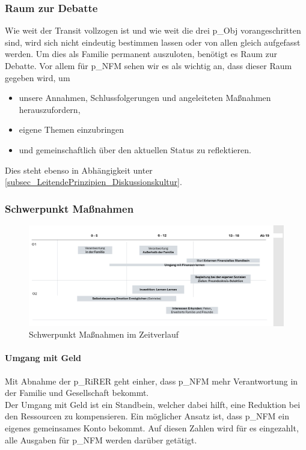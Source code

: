 \subsubsection{Raum zur Debatte} 
Wie weit der Transit vollzogen ist und wie weit die drei \gls{p_Obj} vorangeschritten sind, wird sich nicht eindeutig bestimmen lassen oder von allen gleich aufgefasst werden. Um dies als Familie permanent auszuloten, benötigt es Raum zur Debatte. Vor allem für \gls{p_NFM} sehen wir es als wichtig an, dass dieser Raum gegeben wird, um
\begin{itemize}
	\item unsere Annahmen, Schlussfolgerungen und angeleiteten Maßnahmen herauszufordern, 
	\item eigene Themen einzubringen
	\item und gemeinschaftlich über den aktuellen Status zu reflektieren.
\end{itemize}

Dies steht ebenso in Abhängigkeit unter \ref{subsec_LeitendePrinzipien_Diskussionskultur}.

\subsubsection{Schwerpunkt Maßnahmen}

\begin{figure}[H]
	\centering
	\includegraphics[scale = 0.3]{attachment/chapter_OWN/Scc008.png}
	\caption{Schwerpunkt Maßnahmen im Zeitverlauf}
\end{figure}

\paragraph{Umgang mit Geld}
Mit Abnahme der \gls{p_RiRER} geht einher, dass \gls{p_NFM} mehr Verantwortung in der Familie und Gesellschaft bekommt.\\

Der Umgang mit Geld ist ein Standbein, welcher dabei hilft, eine Reduktion bei den Ressourcen zu kompensieren. Ein möglicher Ansatz ist, dass \gls{p_NFM} ein eigenes gemeinsames Konto bekommt. Auf diesen Zahlen wird für es eingezahlt, alle Ausgaben für \gls{p_NFM} werden darüber getätigt.

